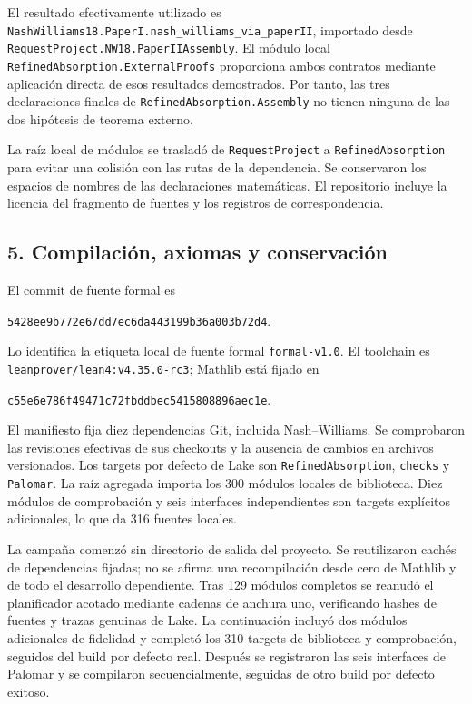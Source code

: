 \documentclass[spanish,11pt,a4paper]{article}
\begin{document}
El resultado efectivamente utilizado es \texttt{Nash\allowbreak{}Williams18.\allowbreak{}Paper\allowbreak{}I.\allowbreak{}nash\_\allowbreak{}williams\_\allowbreak{}via\_\allowbreak{}paper\allowbreak{}II}, importado desde \texttt{Request\allowbreak{}Project.\allowbreak{}NW18.\allowbreak{}Paper\allowbreak{}IIAssembly}. El módulo local \texttt{Refined\allowbreak{}Absorption.\allowbreak{}External\allowbreak{}Proofs} proporciona ambos contratos mediante aplicación directa de esos resultados demostrados. Por tanto, las tres declaraciones finales de \texttt{Refined\allowbreak{}Absorption.\allowbreak{}Assembly} no tienen ninguna de las dos hipótesis de teorema externo.

La raíz local de módulos se trasladó de \texttt{Request\allowbreak{}Project} a \texttt{Refined\allowbreak{}Absorption} para evitar una colisión con las rutas de la dependencia. Se conservaron los espacios de nombres de las declaraciones matemáticas. El repositorio incluye la licencia del fragmento de fuentes y los registros de correspondencia.

\subsection{5. Compilación, axiomas y conservación}\label{compilaciuxf3n-axiomas-y-conservaciuxf3n}

El commit de fuente formal es

\texttt{5428ee9b\allowbreak{}772e67dd\allowbreak{}7ec6da44\allowbreak{}3199b36a\allowbreak{}003b72d4}.

Lo identifica la etiqueta local de fuente formal \texttt{formal-v1.\allowbreak{}0}. El toolchain es \texttt{leanprover/\allowbreak{}lean4:v4.\allowbreak{}35.\allowbreak{}0-rc3}; Mathlib está fijado en

\texttt{c55e6e78\allowbreak{}6f49471c\allowbreak{}72fbddbe\allowbreak{}c5415808\allowbreak{}896aec1e}.

El manifiesto fija diez dependencias Git, incluida Nash--Williams. Se comprobaron las revisiones efectivas de sus checkouts y la ausencia de cambios en archivos versionados. Los targets por defecto de Lake son \texttt{Refined\allowbreak{}Absorption}, \texttt{checks} y \texttt{Palomar}. La raíz agregada importa los 300 módulos locales de biblioteca. Diez módulos de comprobación y seis interfaces independientes son targets explícitos adicionales, lo que da 316 fuentes locales.

La campaña comenzó sin directorio de salida del proyecto. Se reutilizaron cachés de dependencias fijadas; no se afirma una recompilación desde cero de Mathlib y de todo el desarrollo dependiente. Tras 129 módulos completos se reanudó el planificador acotado mediante cadenas de anchura uno, verificando hashes de fuentes y trazas genuinas de Lake. La continuación incluyó dos módulos adicionales de fidelidad y completó los 310 targets de biblioteca y comprobación, seguidos del build por defecto real. Después se registraron las seis interfaces de Palomar y se compilaron secuencialmente, seguidas de otro build por defecto exitoso.
\end{document}
